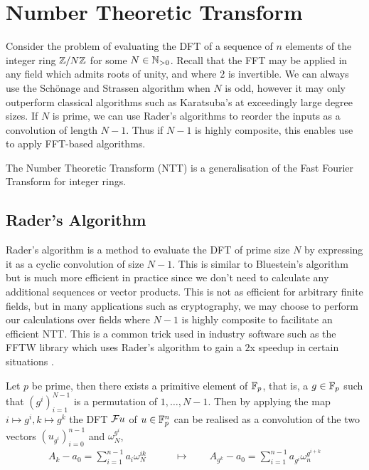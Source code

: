 \section{Number Theoretic Transform}
\label{sec:ntt}


Consider the problem of evaluating the DFT of a sequence of $n$ elements of the integer ring ${\mathbb Z}/N{\mathbb Z}$ for some $N \in {\mathbb N}_{> 0}$. Recall that the FFT may be applied in any field which admits roots of unity, and where $2$ is invertible. We can always use the Sch\"{o}nage and Strassen algorithm when $N$ is odd, however it may only outperform classical algorithms such as Karatsuba's at exceedingly large degree sizes. If $N$ is prime, we can use Rader's algorithms to reorder the inputs as a convolution of length $N-1$. Thus if $N - 1$ is highly composite, this enables use to apply FFT-based algorithms.

The Number Theoretic Transform (NTT) is a generalisation of the Fast Fourier Transform for integer rings.

\subsection{Rader's Algorithm}
\label{subsec:rt}

Rader's algorithm is a method to evaluate the DFT of prime size $N$ by expressing it as a cyclic convolution of size $N - 1$. This is similar to Bluestein's algorithm but is much more efficient in practice since we don't need to calculate any additional sequences or vector products. This is not as efficient for arbitrary finite fields, but in many applications such as cryptography, we may choose to perform our calculations over fields where $N - 1$ is highly composite to facilitate an efficient NTT. This is a common trick used in industry software such as the FFTW library which uses Rader's algorithm to gain a $2$x speedup in certain situations \cite{fftw}.

\begin{definition}\label{thm:rader-transform}
    Let $p$ be prime, then there exists a primitive element of ${\mathbb F}_p$, that is, a $g \in {\mathbb F}_p$ such that $(g^i)_{i=1}^{N-1}$ is a permutation of $1, \ldots, N-1$. Then by applying the map $i \mapsto g^i, k \mapsto g^k$ the DFT $\mathcal Fu$ of $u \in {\mathbb F}_p^n$ can be realised as a convolution of the two vectors $(u_{g^i})_{i=0}^{n-1}$ and $\omega_N^{g^i}$,
    \begin{align*}
        A_k - a_0 = \sum^{n-1}_{i=1} a_i \omega_N^{ik} \qquad &\mapsto \qquad A_{g^k} - a_0 = \sum^{n-1}_{i=1} a_{g^i}\omega_n^{g^{i+k}}
    \end{align*}
\end{definition}

